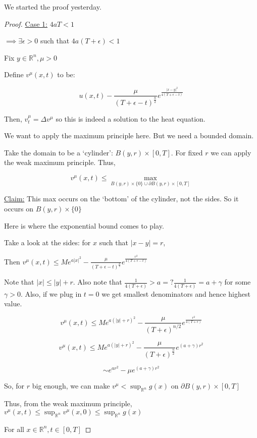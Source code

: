 \documentclass{article}
\theoremstyle{definition}
\begin{document}
We started the proof yesterday.

\begin{proof}
    \underline{Case 1:} \(4aT < 1\) 

    \(\implies  \exists \epsilon >0\) such that \(4a(T+\epsilon) < 1\)
    
    Fix \(y\in \mathbb{R}^n, \mu >0\) 

    Define \(v^\mu(x,t)\) to be:

    \[
        u(x,t) - \frac{\mu}{(T + \epsilon - t)^\frac{n}{2}}e^{\frac{\vert x - y \vert ^2}{4(T + \epsilon - t)}}
    \]

    Then, \(v^\mu_t = \Delta v^\mu\) so this is indeed a solution to the heat equation.

    We want to apply the maximum principle here. But we need a bounded domain.

    Take the domain to be a `cylinder': \(B(y,r)\times [0,T]\). For fixed \(r\) we can apply the weak maximum principle. Thus,

    \[
        v^\mu(x,t) \leq \max_{B(y,r)\times \{ 0 \} \cup \partial B(y,r)\times [0,T]}
    \]

    \underline{Claim:} This max occurs on the `bottom' of the cylinder, not the sides. So it occurs on \(B(y,r)\times \{ 0 \} \) 

    Here is where the exponential bound comes to play.

    Take a look at the sides: for \(x\) such that \(\vert x - y \vert = r\),

    Then \(v^\mu(x,t) \leq Me^{a \vert x \vert ^2} - \frac{\mu}{(T + \epsilon  - t)^\frac{n}{2}} e^{\frac{r^2}{4(T+\epsilon -t)}}\) 

    Note that \(\vert x \vert \leq \vert y \vert + r\). Also note that \(\frac{1}{4(T+\epsilon)}> a =?\frac{1}{4(T+\epsilon)} = a + \gamma\) for some \(\gamma > 0\). Also, if we plug in \(t = 0\) we get smallest denominators and hence highest value.
    
    \[
        v^\mu(x,t) \leq Me^{a (\vert y \vert + r)^2} - \frac{\mu}{(T + \epsilon )^{n / 2}}e^{\frac{r^2}{4(T+\epsilon)}}
    \]

    \[
        v^\mu(x,t)\leq M e^{a(\vert y \vert + r)^2} - \frac{\mu}{(T+\epsilon )^\frac{n}{2}}e^{(a+ \gamma )r^2}
    \]

    \[
        \sim e^{ar^2} - \mu e^{(a+\gamma)r^2}
    \]

    So, for \(r\) big enough, we can make \(v^\mu < \sup_{\mathbb{R}^n} g(x)\) on \(\partial B(y,r)\times [0,T]\)  

    Thus, from the weak maximum principle, \(v^\mu(x,t) \leq \sup_{\mathbb{R}^n}v^\mu(x,0) \leq \sup_{\mathbb{R}^n} g(x)\) 

    For all \(x\in \mathbb{R}^n, t\in [0,T]\) 

\end{proof}
\end{document}
